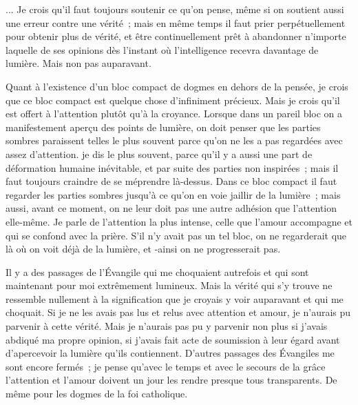\documentclass[french,twoside]{book} %
\begin{document}
\noindent ... Je crois qu'il faut toujours soutenir ce qu'on pense, même si on soutient aussi une erreur contre une vérité ; mais en même temps il faut prier perpétuellement pour obtenir plus de vérité, et être continuellement prêt à abandonner n'importe laquelle de ses opinions dès l'instant où l'intelligence recevra davantage de lumière. Mais non pas auparavant.\par
Quant à l'existence d'un bloc compact de dogmes en dehors de la pensée, je crois que ce bloc compact est quelque chose d'infiniment précieux. Mais je crois qu'il est offert à l'attention plutôt qu'à la croyance. Lorsque dans un pareil bloc on a manifestement aperçu des points de lumière, on doit penser que les parties sombres paraissent telles le plus souvent parce qu'on ne les a pas regardées avec assez d'attention. je dis le plus souvent, parce qu'il y a aussi une part de déformation humaine inévitable, et par suite des parties non inspirées ; mais il faut toujours craindre de se méprendre là-dessus. Dans ce bloc compact il faut regarder les parties sombres jusqu'à ce qu'on en voie jaillir de la lumière ; mais aussi, avant ce moment, on ne leur doit pas une autre adhésion que l'attention elle-même. Je parle de l'attention la plus intense, celle que l'amour accompagne et qui se confond avec la prière. S'il n'y avait pas un tel bloc, on ne regarderait que là où on voit déjà de la lumière, et -ainsi on ne progresserait pas.\par
Il y a des passages de l'Évangile qui me choquaient autrefois et qui sont maintenant pour moi extrêmement lumineux. Mais la vérité qui s'y trouve ne ressemble nullement à la signification que je croyais y voir auparavant et qui me choquait. Si je ne les avais pas lus et relus avec attention et amour, je n'aurais pu parvenir à cette vérité. Mais je n'aurais pas pu y parvenir non plus si j'avais abdiqué ma propre opinion, si j'avais fait acte de soumission à leur égard avant d'apercevoir la lumière qu'ils contiennent. D'autres passages des Évangiles me sont encore fermés ; je pense qu'avec le temps et avec le secours de la grâce l'attention et l'amour doivent un jour les rendre presque tous transparents. De même pour les dogmes de la foi catholique.\par
\end{document}
